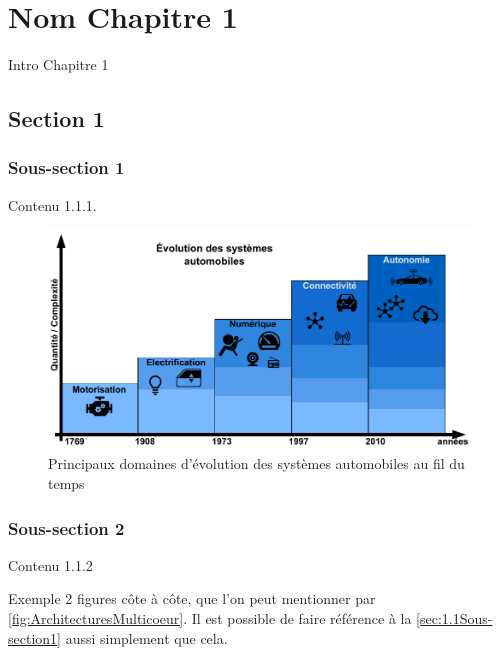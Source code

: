 \documentclass[french, a4paper, 11pt, twoside, pdftex]{StyleThese}
\begin{document}
\setcounter{chapter}{1}
\dominitoc
\faketableofcontents
\fi

\chapter{Nom Chapitre 1} \label{chap:1_EnjeuxIntro}
\minitoc

Intro Chapitre 1

\section{Section 1}
	\subsection{Sous-section 1} \label{sec:1.1Sous-section1}

		Contenu 1.1.1.

		\begin{figure}[ht!]
			\centering
			\includegraphics[width=0.9\linewidth]{schemas/Evo_Sys_Automobile}
			\caption[Évolutions des Systèmes Automobiles]{Principaux domaines d'évolution des systèmes automobiles au fil du temps}
			\label{fig:evo_sys_automobile}
		\end{figure}



	\subsection{Sous-section 2}

		Contenu 1.1.2

		Exemple 2 figures côte à côte, que l'on peut mentionner par \autoref{fig:ArchitecturesMulticoeur}.
		Il est possible de faire référence à la \autoref{sec:1.1Sous-section1} aussi simplement que cela.
\end{document}
